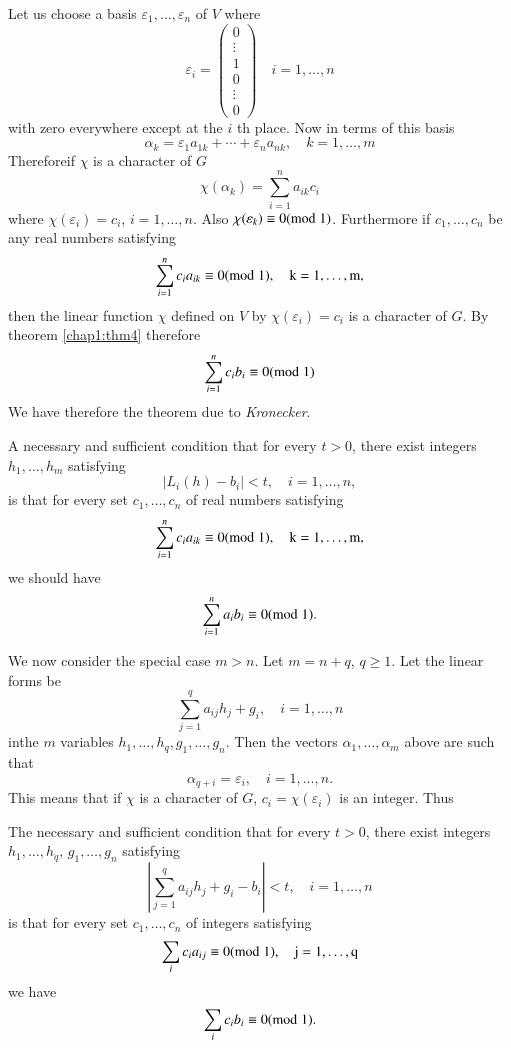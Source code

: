 Let us choose a basis $\varepsilon_{1},\ldots,\varepsilon_{n}$ of $V$ where
$$
\varepsilon_{i}=
\begin{pmatrix}
0\\
\vdots\\
1\\
0\\
\vdots\\
0
\end{pmatrix}\quad 
i=1,\ldots,n
$$
with zero everywhere except at the $i$ th place. Now in terms of this
basis
$$
\alpha_{k}=\varepsilon_{1}a_{1k}+\cdots+\varepsilon_{n}a_{nk},\quad
k=1,\ldots,m
$$
Therefore\pageoriginale if $\chi$ is a character of $G$
$$
\chi(\alpha_{k})=\sum^{n}_{i=1}a_{ik}c_{i}
$$
where $\chi(\varepsilon_{i})=c_{i}$, $i=1,\ldots,n$. Also
$\chi(\varepsilon_{k})\equiv 0(\rm{mod} \; 1)$. Furthermore if
$c_{1},\ldots,c_{n}$ be any real numbers satisfying
$$
\sum^{n}_{i=1}c_{i}a_{ik}\equiv 0(\rm{mod} \; 1),\quad k=1,\ldots,m,
$$
then the linear function $\chi$ defined on $V$ by
$\chi(\varepsilon_{i})=c_{i}$ is a character of $G$. By theorem
\ref{chap1:thm4} therefore
$$
\sum^{n}_{i=1}c_{i}b_{i}\equiv 0(\rm{mod} \; 1)
$$
We have therefore the theorem due to {\em Kronecker}.

\begin{thm}\label{chap1:thm5}
A necessary and sufficient condition that for every $t>0$, there exist
integers $h_{1},\ldots,h_{m}$ satisfying
$$
|L_{i}(h)-b_{i}|<t,\quad i=1,\ldots,n,
$$
is that for every set $c_{1},\ldots,c_{n}$ of real numbers satisfying
$$
\sum^{n}_{i=1}c_{i}a_{ik}\equiv 0(\rm{mod} \; 1),\quad k=1,\ldots,m,
$$
we should have
$$
\sum^{n}_{i=1}a_{i}b_{i}\equiv 0(\rm{mod} \; 1).
$$
\end{thm}

We now consider the special case $m>n$. Let $m=n+q$, $q\geq 1$. Let
the linear forms be
$$
\sum^{q}_{j=1}a_{ij}h_{j}+g_{i},\quad i=1,\ldots,n
$$
in\pageoriginale the $m$ variables
$h_{1},\ldots,h_{q},g_{1},\ldots,g_{n}$. Then the vectors
$\alpha_{1},\ldots,\alpha_{m}$ above are such that
$$
\alpha_{q+i}=\varepsilon_{i},\quad i=1,\ldots,n.
$$
This means that if $\chi$ is a character of $G$,
$c_{i}=\chi(\varepsilon_{i})$ is an integer. Thus

\begin{cor}\label{chap1:coro1}
The necessary and sufficient condition that for every $t>0$, there
exist integers $h_{1},\ldots,h_{q}$, $g_{1},\ldots,g_{n}$ satisfying
$$
\left|\sum^{q}_{j=1}a_{ij}h_{j}+g_{i}-b_{i}\right|<t,\quad i=1,\ldots,n
$$
is that for every set $c_{1},\ldots,c_{n}$ of integers satisfying
$$
\sum_{i}c_{i}a_{ij}\equiv 0(\rm{mod} \; 1),\quad j=1,\ldots,q
$$
we have
$$
\sum_{i}c_{i}b_{i}\equiv 0(\rm{mod} \; 1).
$$
\end{cor}

